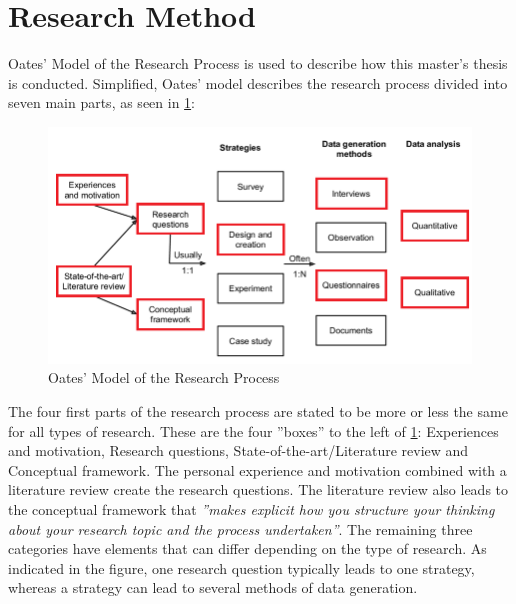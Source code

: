     

\section{Research Method}
    Oates'\cite{research} Model of the Research Process is used to describe how this master's thesis is conducted. Simplified, Oates' model describes the research process divided into seven main parts, as seen in \cref{fig:oates}:
    
    \FloatBarrier
    \begin{figure}[htbp]
        \centering
        \includegraphics[width=\ImageWidth]{figures/oates_highlighted.png}
        \caption{Oates' Model of the Research Process}
        \label{fig:oates}
    \end{figure}
    \FloatBarrier
    
    The four first parts of the research process are stated to be more or less the same for all types of research. These are the four ''boxes'' to the left of \cref{fig:oates}: Experiences and motivation, Research questions, State-of-the-art/Literature review and Conceptual framework. The personal experience and motivation combined with a literature review create the research questions. The literature review also leads to the conceptual framework that \emph{''makes explicit how you structure your thinking about your research topic and the process undertaken''}. The remaining three categories have elements that can differ depending on the type of research. As indicated in the figure, one research question typically leads to one strategy, whereas a strategy can lead to several methods of data generation.
    
